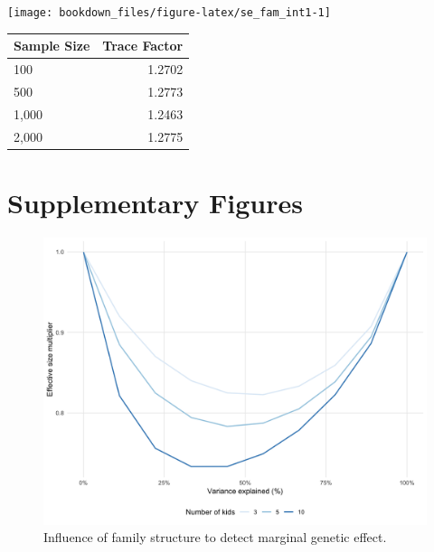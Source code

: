 \documentclass[]{book}
\theoremstyle{definition}
\theoremstyle{definition}
\theoremstyle{definition}
\theoremstyle{remark}
\begin{document}
\begin{center}\texttt{[image: bookdown\_files/figure-latex/se\_fam\_int1-1]} \end{center}

\begin{tabular}{l|r}
\hline
Sample Size & Trace Factor\\
\hline
100 & 1.2702\\
\hline
500 & 1.2773\\
\hline
1,000 & 1.2463\\
\hline
2,000 & 1.2775\\
\hline
\end{tabular}

\section{Supplementary Figures}\label{supplementary-figures}

\begin{figure}

{\centering \includegraphics[width=1\linewidth]{figures/05-figure-sup-power-marginal-kids} 

}

\caption{Influence of family structure to detect
marginal genetic effect.}\label{fig:power-marginal-kids}
\end{figure}
\end{document}
